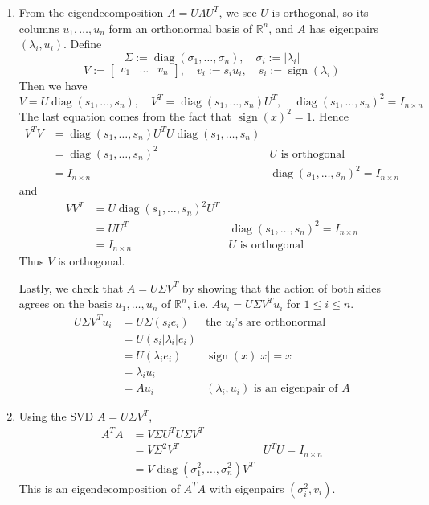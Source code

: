 \documentclass{article}
\def\mbb#1{\mathbb{#1}}
\def\bR{\mbb{R}}
\newcommand{\m}[2][b]{\begin{#1matrix}#2\end{#1matrix}}
\DeclareMathOperator{\diag}{diag}
\renewcommand{\L}{\Lambda}
\renewcommand{\l}{\lambda}
\newcommand{\s}{\sigma}
\renewcommand{\S}{\Sigma}
\DeclareMathOperator{\sign}{sign}
\begin{document}
\begin{enumerate}
\begin{enumerate}
		\item From the eigendecomposition $A=U\L U^T$, we see $U$ is orthogonal, so its columns $u_1,\dots,u_n$ form an orthonormal basis of $\bR^n$, and $A$ has eigenpairs $(\l_i,u_i)$. Define
		\[\S := \diag(\s_1,\dots,\s_n),
		\quad \s_i := |\l_i|\]
		\[V := \m{v_1 & \dots & v_n},
		\quad v_i := s_iu_i,
		\quad s_i := \sign(\l_i)\]
		Then we have
		\[V = U\diag(s_1,\dots,s_n),
		\quad V^T = \diag(s_1,\dots,s_n)U^T,
		\quad \diag(s_1,\dots,s_n)^2 = I_{n\times n}\]
		The last equation comes from the fact that $\sign(x)^2=1$. Hence
		\begin{align*}
			V^TV &= \diag(s_1,\dots,s_n)U^TU\diag(s_1,\dots,s_n) \\
			&= \diag(s_1,\dots,s_n)^2 & \text{$U$ is orthogonal} \\
			&= I_{n\times n} & \diag(s_1,\dots,s_n)^2 = I_{n\times n}
		\end{align*}
		and
		\begin{align*}
			VV^T &= U\diag(s_1,\dots,s_n)^2U^T \\
			&= UU^T & \diag(s_1,\dots,s_n)^2 = I_{n\times n} \\
			&= I_{n\times n} & \text{$U$ is orthogonal}
		\end{align*}
		Thus $V$ is orthogonal.
		
		Lastly, we check that $A=U\S V^T$ by showing that the action of both sides agrees on the basis $u_1,\dots,u_n$ of $\bR^n$, i.e. $Au_i=U\S V^Tu_i$ for $1\le i\le n$.
		\begin{align*}
			U\S V^Tu_i &= U\S(s_ie_i) & \text{the $u_i$'s are orthonormal} \\
			&= U(s_i|\l_i|e_i) \\
			&= U(\l_ie_i) & \sign(x)|x| = x \\
			&= \l_iu_i \\
			&= Au_i & \text{$(\l_i,u_i)$ is an eigenpair of $A$}
		\end{align*}
		
		
		
		\item Using the SVD $A=U\S V^T$,
		\begin{align*}
			A^TA &= V\S U^TU\S V^T \\
			&= V\S^2V^T & U^TU = I_{n\times n} \\
			&= V\diag(\s_1^2,\dots,\s_n^2)V^T
		\end{align*}
		This is an eigendecomposition of $A^TA$ with eigenpairs $(\s_i^2,v_i)$.
		
		
		

\end{enumerate}
\end{enumerate}
\end{document}
